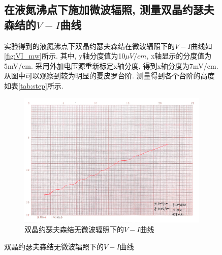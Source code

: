 \documentclass[font=default]{mpltx}
\begin{document}
\begin{figure}[h]
  \subsection{在液氮沸点下施加微波辐照, 测量双晶约瑟夫森结的$V-I$曲线}
  实验得到的液氮沸点下双晶约瑟夫森结在微波辐照下的$V-I$曲线如\autoref{fig:VI_mw}所示. 其中, y轴分度值为10$\mu V/cm$, x轴显示的分度值为5mV/cm.
  采用外加电压源重新标定x轴分度, 得到x轴分度为7mV/cm.
  从图中可以观察到较为明显的夏皮罗台阶.
  测量得到各个台阶的高度如表\autoref{tab:step}所示.
  \begin{figure}[htbp]
      \centering
      \includegraphics[width=0.85\linewidth]{fig/5.jpg}
      \caption{双晶约瑟夫森结无微波辐照下的$V-I$曲线}
      \label{fig:VI_mw}
    \end{figure}
  

\end{figure}
\end{document}
